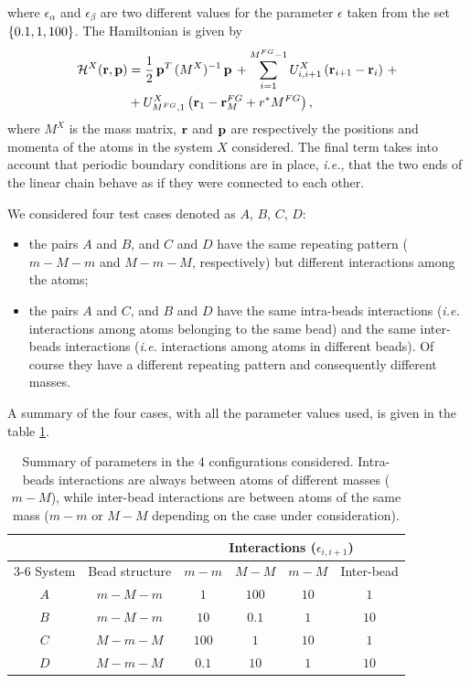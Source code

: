 \documentclass[10pt,a4paper]{book}
\theoremstyle{definition}
\begin{document}
where $\epsilon_\alpha$ and $\epsilon_\beta$ are two different values for the parameter $\epsilon$ taken from the set $\left\lbrace 0.1,1,100\right\rbrace$.
The Hamiltonian is given by
\begin{equation}
 \begin{split}
  	\mathcal{H}^X(\mathbf{r},\mathbf{p}) &= \frac12 \, \mathbf{p}^T\,(M^X)^{-1}\,\mathbf{p}\,+\sum_{i=1}^{M^{FG}-1}U^X_{i,i+1}\left(\mathbf{r}_{i+1}-\mathbf{r}_i\right)\,+ \\
	&+ U^X_{M^{FG},1}\left(\mathbf{r}_1-\mathbf{r}_M^{FG}+r^*M^{FG}\right),
 \end{split}
 \label{eq:1DHamiltonian}
\end{equation}
where $M^X$ is the mass matrix, $\mathbf{r}$ and $\mathbf{p}$ are respectively the positions and momenta of the atoms in the system $X$ considered. 
The final term takes into account that periodic boundary conditions are in place, \textit{i.e.}, that the two ends of the linear chain behave as if they were connected to each other.

We considered four test cases denoted as $A$, $B$, $C$, $D$:
\begin{itemize}
 \item the pairs $A$ and $B$, and $C$ and $D$ have the same repeating pattern  ($m-M-m$ and $M-m-M$, respectively) but different interactions among the atoms;
 \item the pairs $A$ and $C$, and $B$ and $D$ have the same intra-beads interactions (\textit{i.e.} interactions among atoms belonging to the same bead) and the same inter-beads interactions (\textit{i.e.} interactions among atoms in different beads). Of course they have a different repeating pattern and consequently different masses.
\end{itemize}
A summary of the four cases, with all the parameter values used, is given in the table \ref{Tab:Cases}.
\begin{table}[htb]
 \centering
 \begin{tabular}{c c c c c c} 
  \toprule[1.1pt]
   &  & \multicolumn{4}{c}{Interactions ($\epsilon_{i,i+1}$)} \\
  \cmidrule(l){3-6}
  System & Bead structure & $m-m$ & $M-M$ & $m-M$ & Inter-bead \\
  \midrule
  $A$ & $m-M-m$ & $1$ & $100$ & $10$ & $1$ \\ 
  $B$ & $m-M-m$ & $10$ & $0.1$ & $1$  & $10$ \\  
  $C$ & $M-m-M$ & $100$ & $1$ & $10$ & $1$ \\
  $D$ & $M-m-M$ & $0.1$ & $10$ & $1$ & $10$ \\
  \bottomrule[1.1pt]
 \end{tabular}
 \caption{Summary of parameters in the 4 configurations considered. Intra-beads interactions are always between atoms of different masses ($m-M$), while inter-bead interactions are between atoms of the same mass ($m-m$ or $M-M$ depending on the case under consideration).}
 \label{Tab:Cases}
\end{table}
\end{document}
